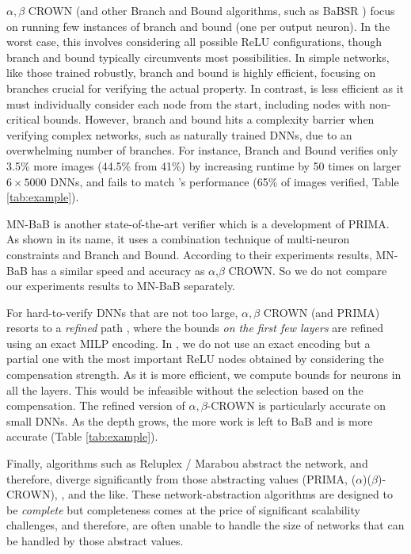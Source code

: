 $\alpha,\beta$ CROWN \cite{crown} (and other Branch and Bound algorithms, such as BaBSR \cite{BaB}) focus on running few instances of branch and bound (one per output neuron).  In the worst case, this involves considering all possible ReLU configurations, though branch and bound typically circumvents most possibilities. In simple networks, like those trained robustly, branch and bound is highly efficient, focusing on branches crucial for verifying the actual property. In contrast, {\CMP} is less efficient as it must individually consider each node from the start, including nodes with non-critical bounds. However, branch and bound hits a complexity barrier when verifying complex networks, such as naturally trained DNNs, due to an overwhelming number of branches. For instance, Branch and Bound verifies only 3.5\% more images (44.5\% from 41\%) by increasing runtime by 50 times on larger $6 \times 5000$ DNNs, and fails to match {\CMP}'s performance (65\% of images verified, Table \ref{tab:example}). 

{\color{red} MN-BaB \cite{ferrari2022complete} is another state-of-the-art verifier which is a development of PRIMA. As shown in its name, it uses a combination technique of multi-neuron constraints and Branch and Bound. According to their experiments results, MN-BaB has a similar speed and accuracy as $\alpha$,$\beta$ CROWN. So we do not compare our experiments results to MN-BaB separately.}

For hard-to-verify DNNs that are not too large,  $\alpha,\beta$ CROWN (and PRIMA) resorts to a {\em refined} path \cite{MILP2}, where the bounds {\em on the first few layers} are refined using an exact MILP encoding. In {\CMP}, we do not use an exact encoding but a partial one with the most important ReLU nodes obtained by considering the compensation strength. As it is more efficient, we compute bounds for neurons in all the layers. This would be infeasible without the selection based on the compensation. The refined version of $\alpha,\beta$-CROWN is particularly accurate on small DNNs. As the depth grows, the more work is left to BaB and \CMP is more accurate (Table \ref{tab:example}).

Finally, algorithms such as Reluplex / Marabou \cite{Reluplex,katz2019marabou}  abstract the network, and therefore,  diverge significantly from those abstracting values (PRIMA, ($\alpha$)($\beta$)-CROWN)\cite{prima,crown}, {\CMP}, and the like. These network-abstraction algorithms are designed to be {\em complete} but completeness comes at the price of significant scalability challenges, and therefore, are often unable to handle the size of networks that can be handled by those abstract values. 
